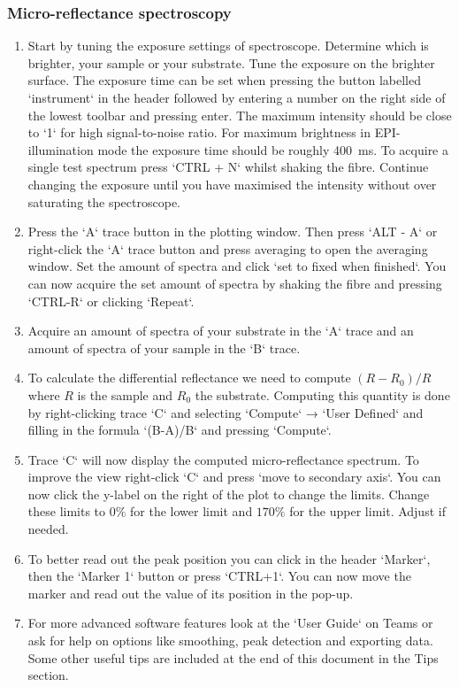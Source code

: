 \documentclass[a4paper]{scrartcl}
\begin{document}
\subsubsection*{Micro-reflectance spectroscopy}
\begin{enumerate}
	\item Start by tuning the exposure settings of spectroscope. Determine which is brighter, your sample or your substrate. Tune the exposure on the brighter surface. The exposure time can be set when pressing the button labelled `instrument` in the header followed by entering a number on the right side of the lowest toolbar and pressing enter. The maximum intensity should be close to `1` for high signal-to-noise ratio. For maximum brightness in EPI-illumination mode the exposure time should be roughly \SI{400}{\milli \second}. To acquire a single test spectrum press `CTRL + N` whilst shaking the fibre. Continue changing the exposure until you have maximised the intensity without over saturating the spectroscope.
	\item Press the `A` trace button in the plotting window. Then press `ALT - A` or right-click the `A` trace button and press averaging to open the averaging window. Set the amount of spectra and click `set to fixed when finished`. You can now acquire the set amount of spectra by shaking the fibre and pressing `CTRL-R` or clicking `Repeat`.
	\item Acquire an amount of spectra of your substrate in the `A` trace and an amount of spectra of your sample in the `B` trace.
	\item To calculate the differential reflectance we need to compute $(R-R_0)/R$ where $R$ is the sample and $R_0$ the substrate. Computing this quantity is done by right-clicking trace `C` and selecting `Compute` → `User Defined` and filling in the formula `(B-A)/B` and pressing `Compute`.
	\item Trace `C` will now display the computed micro-reflectance spectrum. To improve the view right-click `C` and press `move to secondary axis`. You can now click the y-label on the right of the plot to change the limits. Change these limits to $0\%$ for the lower limit and $170\%$ for the upper limit. Adjust if needed.
	\item To better read out the peak position you can click in the header `Marker`, then the `Marker 1` button or press `CTRL+1`. You can now move the marker and read out the value of its position in the pop-up.
	\item For more advanced software features look at the `User Guide` on Teams or ask for help on options like smoothing, peak detection and exporting data.\\
	      Some other useful tips are included at the end of this document in the Tips section.
\end{enumerate}
\newpage
\end{document}
